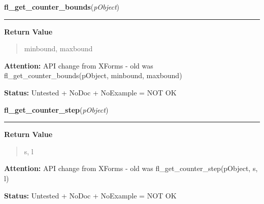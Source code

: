 \hspace{.8\funcindent}\begin{boxedminipage}{\funcwidth}

    \raggedright \textbf{fl\_get\_counter\_bounds}(\textit{pObject})

    \vspace{-1.5ex}

    \rule{\textwidth}{0.5\fboxrule}
\setlength{\parskip}{2ex}
\setlength{\parskip}{1ex}
      \textbf{Return Value}
    \vspace{-1ex}

      \begin{quote}
      minbound, maxbound

      \end{quote}

\textbf{Attention:} API change from XForms - old was fl\_get\_counter\_bounds(pObject, 
minbound, maxbound)



\textbf{Status:} Untested + NoDoc + NoExample = NOT OK



    \end{boxedminipage}

    \label{xformslib:library:fl_get_counter_step}

    \vspace{0.5ex}

\hspace{.8\funcindent}\begin{boxedminipage}{\funcwidth}

    \raggedright \textbf{fl\_get\_counter\_step}(\textit{pObject})

    \vspace{-1.5ex}

    \rule{\textwidth}{0.5\fboxrule}
\setlength{\parskip}{2ex}
\setlength{\parskip}{1ex}
      \textbf{Return Value}
    \vspace{-1ex}

      \begin{quote}
      s, l

      \end{quote}

\textbf{Attention:} API change from XForms - old was fl\_get\_counter\_step(pObject, s, l)



\textbf{Status:} Untested + NoDoc + NoExample = NOT OK



    \end{boxedminipage}

